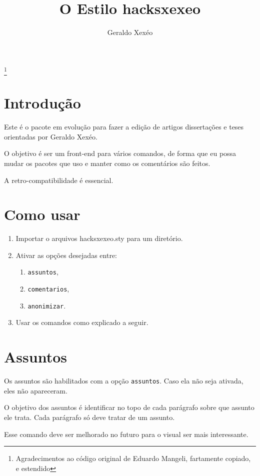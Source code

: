 \documentclass{article}
\title{O Estilo hacksxexeo}
\author{Geraldo Xexéo}
\begin{document}
\maketitle
\thanks{Agradecimentos ao código original de Eduardo Mangeli, fartamente copiado, e estendido}

\section{Introdução}

Este é o pacote em evolução para fazer a edição de artigos dissertações e teses orientadas por Geraldo Xexéo.

O objetivo é ser um front-end para vários comandos, de forma que eu possa mudar os pacotes que uso e manter como os comentários são feitos.

A retro-compatibilidade é essencial.

\section{Como usar}

\begin{enumerate}
    \item Importar o arquivos hacksxexeo.sty para um diretório.
    \item Ativar as opções desejadas entre:
    \begin{enumerate}
        \item \verb!assuntos!,
        \item \verb!comentarios!,
        \item \verb!anonimizar!.
    \end{enumerate}
    \item Usar os comandos como explicado a seguir.
\end{enumerate}


\section{Assuntos}

Os assuntos são habilitados com a opção \verb!assuntos!. Caso ela não seja ativada, eles não apareceram.

O objetivo dos assuntos é identificar no topo de cada parágrafo sobre que assunto ele trata. Cada parágrafo só deve tratar de um assunto.

Esse comando deve ser melhorado no futuro para o visual ser mais interessante.
\end{document}
